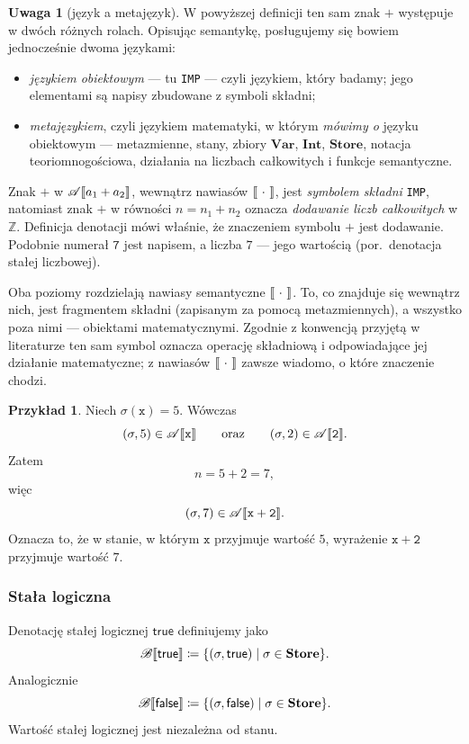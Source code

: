 \documentclass[11pt,a4paper]{article}
\theoremstyle{definition}
\newtheorem{uwaga}[definicja]{Uwaga}
\newtheorem{przyklad}[definicja]{Przykład}
\theoremstyle{plain}
\DeclarePairedDelimiter{\semdelim}{\llbracket}{\rrbracket}
\newcommand{\sem}[1]{\semdelim{#1}}
\newcommand{\Aa}{\mathscr{A}}   %
\newcommand{\Bb}{\mathscr{B}}   %
\newcommand{\Store}{\textbf{Store}}
\newcommand{\Int}{\textbf{Int}}
\newcommand{\Var}{\textbf{Var}}
\newcommand{\kw}[1]{\ensuremath{\mathsf{#1}}} %
\begin{document}
\begin{uwaga}[język a metajęzyk]\label{uw:metajezyk}
	W powyższej definicji ten sam znak $+$ występuje w dwóch różnych rolach.
	Opisując semantykę, posługujemy się bowiem jednocześnie dwoma językami:
	\begin{itemize}
		\item \emph{językiem obiektowym} --- tu \texttt{IMP} --- czyli językiem,
		który badamy; jego elementami są napisy zbudowane z symboli składni;
		\item \emph{metajęzykiem}, czyli językiem matematyki, w którym
		\emph{mówimy o} języku obiektowym --- metazmienne, stany, zbiory
		$\Var$, $\Int$, $\Store$, notacja teoriomnogościowa, działania na
		liczbach całkowitych i funkcje semantyczne.
	\end{itemize}
	Znak $+$ w $\Aa\sem{a_1+a_2}$, wewnątrz nawiasów $\sem{\ \cdot\ }$, jest
	\emph{symbolem składni} \texttt{IMP}, natomiast znak $+$ w równości
	$n=n_1+n_2$ oznacza \emph{dodawanie liczb całkowitych} w $\mathbb Z$.
	Definicja denotacji mówi właśnie, że znaczeniem symbolu $+$ jest
	dodawanie. Podobnie numerał $\mathtt{7}$ jest napisem, a liczba $7$ --- jego
	wartością (por.\ denotacja stałej liczbowej).
	
	Oba poziomy rozdzielają nawiasy semantyczne $\sem{\ \cdot\ }$. To, co
	znajduje się wewnątrz nich, jest fragmentem składni (zapisanym za pomocą
	metazmiennych), a wszystko poza nimi --- obiektami matematycznymi.
	Zgodnie z konwencją przyjętą w literaturze ten sam symbol oznacza
	operację składniową i odpowiadające jej działanie matematyczne; z nawiasów
	$\sem{\ \cdot\ }$ zawsze wiadomo, o które znaczenie chodzi.
\end{uwaga}

\begin{przyklad}\label{prz:wyr}
	Niech $\sigma(\mathtt{x})=5$. Wówczas
	\[
	(\sigma,5)\in\Aa\sem{\mathtt{x}}
	\qquad\text{oraz}\qquad
	(\sigma,2)\in\Aa\sem{\mathtt{2}}.
	\]
	Zatem
	\[
	n=5+2=7,
	\]
	więc
	\[
	(\sigma,7)\in\Aa\sem{\mathtt{x}+\mathtt{2}}.
	\]
	Oznacza to, że w stanie, w którym $\mathtt{x}$ przyjmuje wartość $5$, wyrażenie
	$\mathtt{x}+\mathtt{2}$ przyjmuje wartość $7$.
\end{przyklad}

\subsubsection{Stała logiczna}

Denotację stałej logicznej $\kw{true}$ definiujemy jako
\[
\Bb\sem{\kw{true}}
\coloneqq 
\{(\sigma,\kw{true})\mid \sigma\in\Store\}.
\]
Analogicznie
\[
\Bb\sem{\kw{false}}
\coloneqq 
\{(\sigma,\kw{false})\mid \sigma\in\Store\}.
\]
Wartość stałej logicznej jest niezależna od stanu.
\end{document}
